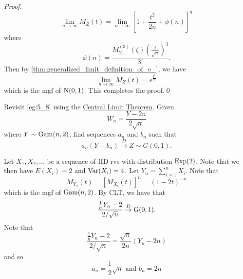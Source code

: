 \documentclass[notoc,notitlepage]{tufte-book}
\newcommand{\convd}{\overset{D}{\to}}
\begin{document}
\begin{proof}
  \begin{equation*}
    \lim_{n \to \infty} M_Z (t) = \lim_{n \to \infty} \left[ 1 + \frac{t^2}{2n} + \phi(n) \right]^n
  \end{equation*}
  where 
  \begin{equation*}
    \phi(n) = \frac{M_{Y_i}^{(3)} ( \zeta ) \left( \frac{t}{\sqrt{n}} \right)^3}{3!}.
  \end{equation*}
  Then by \cref{thm:generalized_limit_definition_of_e_}, we have
  \begin{equation*}
    \lim_{n \to \infty} M_Z(t) = e^{\frac{t^2}{2}}
  \end{equation*}
  which is the mgf of $\operatorname{N}(0, 1)$. This completes the proof.\qed
\end{proof}

\begin{eg}[Example 5.9]
  Revisit \cref{eg:5_8} using the \hyperref[thm:central_limit_theorem]{\faCoffee \; Central Limit Theorem}. Given
  \begin{equation*}
    W_n = \frac{Y - 2n}{2 \sqrt{n}}
  \end{equation*}
  where $Y \sim \operatorname{Gam}( n, 2 )$, find sequences $a_n$ and $b_n$ such that
  \begin{equation*}
    a_n ( Y - b_n ) \convd Z \sim G(0, 1).
  \end{equation*}
\end{eg}

\begin{solution}
   Let $X_1, X_2, ...$ be a sequence of IID rvs with distribution $\operatorname{Exp}(2)$. Note that we then have $E(X_i) = 2$ and $\operatorname{Var}(X_i) = 4$. Let $Y_n = \sum_{i=1}^{n} X_i$. Note that
  \begin{equation*}
    M_{Y_n}(t) = [ M_{X_i}(t) ]^n = (1 - 2t)^{-n}
  \end{equation*}
  which is the mgf of $\operatorname{Gam}(n, 2)$. By CLT, we have that
  \begin{equation*}
    \frac{\frac{1}{n} Y_n - 2}{2 / \sqrt{n}} \convd \Gau(0, 1).
  \end{equation*}
  Note that
  \begin{equation*}
    \frac{\frac{1}{n}Y_n - 2}{2 / \sqrt{n}} = \frac{\sqrt{n}}{2 n} ( Y_n - 2n )
  \end{equation*}
  and so
  \begin{equation*}
    a_n = \frac{1}{2}\sqrt{n} \text{ and } b_n = 2n
  \end{equation*}
\end{solution}
\end{document}
